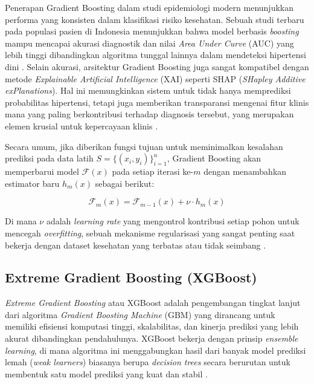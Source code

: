 Penerapan Gradient Boosting dalam studi epidemiologi modern menunjukkan performa yang konsisten dalam klasifikasi risiko kesehatan. Sebuah studi terbaru pada populasi pasien di Indonesia menunjukkan bahwa model berbasis \textit{boosting} mampu mencapai akurasi diagnostik dan nilai \textit{Area Under Curve} (AUC) yang lebih tinggi dibandingkan algoritma tunggal lainnya dalam mendeteksi hipertensi dini \parencite{Wibawa2025Prediction}. Selain akurasi, arsitektur Gradient Boosting juga sangat kompatibel dengan metode \textit{Explainable Artificial Intelligence} (XAI) seperti SHAP (\textit{SHapley Additive exPlanations}). Hal ini memungkinkan sistem untuk tidak hanya memprediksi probabilitas hipertensi, tetapi juga memberikan transparansi mengenai fitur klinis mana yang paling berkontribusi terhadap diagnosis tersebut, yang merupakan elemen krusial untuk kepercayaan klinis \parencite{Li2025XGBoost}.

Secara umum, jika diberikan fungsi tujuan untuk meminimalkan kesalahan prediksi pada data latih $S=\{(x_i,y_i)\}_{i=1}^n$, Gradient Boosting akan memperbarui model $\mathcal{F}(x)$ pada setiap iterasi ke-$m$ dengan menambahkan estimator baru $h_m(x)$ sebagai berikut:

\begin{equation}
    \mathcal{F}_m(x) = \mathcal{F}_{m-1}(x) + \nu \cdot h_m(x)
\end{equation}

Di mana $\nu$ adalah \textit{learning rate} yang mengontrol kontribusi setiap pohon untuk mencegah \textit{overfitting}, sebuah mekanisme regularisasi yang sangat penting saat bekerja dengan dataset kesehatan yang terbatas atau tidak seimbang \parencite{Zhang2025Machine}.

\subsection{Extreme Gradient Boosting (XGBoost)}
\textit{Extreme Gradient Boosting} atau XGBoost adalah pengembangan tingkat lanjut dari algoritma \textit{Gradient Boosting Machine} (GBM) yang dirancang untuk memiliki efisiensi komputasi tinggi, skalabilitas, dan kinerja prediksi yang lebih akurat dibandingkan pendahulunya. XGBoost bekerja dengan prinsip \textit{ensemble learning}, di mana algoritma ini menggabungkan hasil dari banyak model prediksi lemah (\textit{weak learners}) biasanya berupa \textit{decision trees} secara berurutan untuk membentuk satu model prediksi yang kuat dan stabil \parencite{Emmanuel2025Advanced}.

